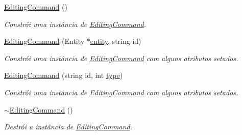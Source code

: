 \begin{DoxyCompactItemize}
\item 
\hyperlink{classbr_1_1ufscar_1_1lince_1_1ginga_1_1wac_1_1editing_1_1EditingCommand_af99c26529017e3493958d90af9f9142c}{EditingCommand} ()
\begin{DoxyCompactList}\small\item\em Constrói uma instância de \hyperlink{classbr_1_1ufscar_1_1lince_1_1ginga_1_1wac_1_1editing_1_1EditingCommand}{EditingCommand}. \item\end{DoxyCompactList}\item 
\hyperlink{classbr_1_1ufscar_1_1lince_1_1ginga_1_1wac_1_1editing_1_1EditingCommand_a394301f565410f3142aab8aed54dec76}{EditingCommand} (Entity $\ast$\hyperlink{classbr_1_1ufscar_1_1lince_1_1ginga_1_1wac_1_1editing_1_1EditingCommand_a080922002fe90bf99390c026e8e99e52}{entity}, string id)
\begin{DoxyCompactList}\small\item\em Constrói uma instância de \hyperlink{classbr_1_1ufscar_1_1lince_1_1ginga_1_1wac_1_1editing_1_1EditingCommand}{EditingCommand} com alguns atributos setados. \item\end{DoxyCompactList}\item 
\hyperlink{classbr_1_1ufscar_1_1lince_1_1ginga_1_1wac_1_1editing_1_1EditingCommand_aed488bae30632bb228aa299e82549da9}{EditingCommand} (string id, int \hyperlink{classbr_1_1ufscar_1_1lince_1_1ginga_1_1wac_1_1editing_1_1EditingCommand_a186e9110f8aae8e562761939a85ee83e}{type})
\begin{DoxyCompactList}\small\item\em Constrói uma instância de \hyperlink{classbr_1_1ufscar_1_1lince_1_1ginga_1_1wac_1_1editing_1_1EditingCommand}{EditingCommand} com alguns atributos setados. \item\end{DoxyCompactList}\item 
\hyperlink{classbr_1_1ufscar_1_1lince_1_1ginga_1_1wac_1_1editing_1_1EditingCommand_ae96e746c3c5c3ac988f6ede8912ccb33}{$\sim$EditingCommand} ()
\begin{DoxyCompactList}\small\item\em Destrói a instância de \hyperlink{classbr_1_1ufscar_1_1lince_1_1ginga_1_1wac_1_1editing_1_1EditingCommand}{EditingCommand}. \item\end{DoxyCompactList}\item 

\end{DoxyCompactItemize}
